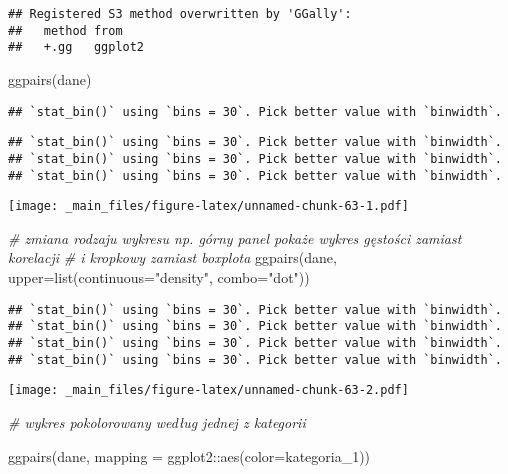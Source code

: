 \documentclass[
]{book}
\newenvironment{Shaded}{\begin{snugshade}}{\end{snugshade}}
\newcommand{\AttributeTok}[1]{\textcolor[rgb]{0.77,0.63,0.00}{#1}}
\newcommand{\CommentTok}[1]{\textcolor[rgb]{0.56,0.35,0.01}{\textit{#1}}}
\newcommand{\FunctionTok}[1]{\textcolor[rgb]{0.00,0.00,0.00}{#1}}
\newcommand{\NormalTok}[1]{#1}
\newcommand{\SpecialCharTok}[1]{\textcolor[rgb]{0.00,0.00,0.00}{#1}}
\newcommand{\StringTok}[1]{\textcolor[rgb]{0.31,0.60,0.02}{#1}}
\begin{document}
\begin{verbatim}
## Registered S3 method overwritten by 'GGally':
##   method from   
##   +.gg   ggplot2
\end{verbatim}

\begin{Shaded}
\begin{Highlighting}[]
\FunctionTok{ggpairs}\NormalTok{(dane)}
\end{Highlighting}
\end{Shaded}

\begin{verbatim}
## `stat_bin()` using `bins = 30`. Pick better value with `binwidth`.
\end{verbatim}

\begin{verbatim}
## `stat_bin()` using `bins = 30`. Pick better value with `binwidth`.
## `stat_bin()` using `bins = 30`. Pick better value with `binwidth`.
## `stat_bin()` using `bins = 30`. Pick better value with `binwidth`.
\end{verbatim}

\texttt{[image: \_main\_files/figure-latex/unnamed-chunk-63-1.pdf]}

\begin{Shaded}
\begin{Highlighting}[]
\CommentTok{\# zmiana rodzaju wykresu np. górny panel pokaże wykres gęstości zamiast korelacji  }
\CommentTok{\# i kropkowy zamiast boxplota}
\FunctionTok{ggpairs}\NormalTok{(dane, }\AttributeTok{upper=}\FunctionTok{list}\NormalTok{(}\AttributeTok{continuous=}\StringTok{"density"}\NormalTok{, }\AttributeTok{combo=}\StringTok{"dot"}\NormalTok{))}
\end{Highlighting}
\end{Shaded}

\begin{verbatim}
## `stat_bin()` using `bins = 30`. Pick better value with `binwidth`.
## `stat_bin()` using `bins = 30`. Pick better value with `binwidth`.
## `stat_bin()` using `bins = 30`. Pick better value with `binwidth`.
## `stat_bin()` using `bins = 30`. Pick better value with `binwidth`.
\end{verbatim}

\texttt{[image: \_main\_files/figure-latex/unnamed-chunk-63-2.pdf]}

\begin{Shaded}
\begin{Highlighting}[]
\CommentTok{\# wykres pokolorowany według jednej z kategorii}

\FunctionTok{ggpairs}\NormalTok{(dane, }\AttributeTok{mapping =}\NormalTok{ ggplot2}\SpecialCharTok{::}\FunctionTok{aes}\NormalTok{(}\AttributeTok{color=}\NormalTok{kategoria\_1))}
\end{Highlighting}
\end{Shaded}
\end{document}
